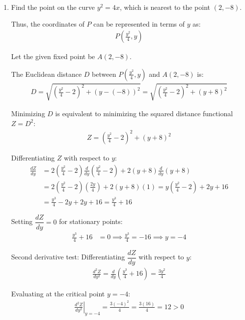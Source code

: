 \begin{enumerate}[label=\thesubsection.\arabic*, ref=\thesubsection.\theenumi]
Cartesian equation: $2x + 3y + 4z = 7$
Vector equation: $\vec{r} \cdot (2\vec{i} + 3\vec{j} + 4\vec{k}) = 7$

\item Find the point on the curve $y^2=4x$, which is nearest to the point $(2,-8)$.

\solution

Thus, the coordinates of $P$ can be represented in terms of $y$ as:
\begin{align*}
	P\left(\frac{y^2}{4}, y\right)
\end{align*}

Let the given fixed point be $A(2, -8)$.

The Euclidean distance $D$ between $P\left(\frac{y^2}{4}, y\right)$ and $A(2, -8)$ is:
\begin{align*}
	D = \sqrt{\left(\frac{y^2}{4} - 2\right)^2 + (y - (-8))^2} = \sqrt{\left(\frac{y^2}{4} - 2\right)^2 + (y + 8)^2}
\end{align*}

Minimizing $D$ is equivalent to minimizing the squared distance functional $Z = D^2$:
\begin{align*}
	Z = \left(\frac{y^2}{4} - 2\right)^2 + (y + 8)^2
\end{align*}

Differentiating $Z$ with respect to $y$:
\begin{align*}
	\frac{dZ}{dy} &= 2\left(\frac{y^2}{4} - 2\right)\frac{d}{dy}\left(\frac{y^2}{4} - 2\right) + 2(y + 8)\frac{d}{dy}(y + 8) \\
	&= 2\left(\frac{y^2}{4} - 2\right)\left(\frac{2y}{4}\right) + 2(y + 8)(1) = y\left(\frac{y^2}{4} - 2\right) + 2y + 16 \\
	&= \frac{y^3}{4} - 2y + 2y + 16 = \frac{y^3}{4} + 16
\end{align*}

Setting $\dfrac{dZ}{dy} = 0$ for stationary points:
\begin{align*}
	\frac{y^3}{4} + 16 &= 0 \implies
	\frac{y^3}{4} = -16 \implies
	y = -4
\end{align*}

Second derivative test:
Differentiating $\dfrac{dZ}{dy}$ with respect to $y$:
\begin{align*}
	\frac{d^2Z}{dy^2} = \frac{d}{dy}\left(\frac{y^3}{4} + 16\right) = \frac{3y^2}{4}
\end{align*}

Evaluating at the critical point $y = -4$:
\begin{align*}
	\left.\frac{d^2Z}{dy^2}\right|_{y=-4} = \frac{3(-4)^2}{4} = \frac{3(16)}{4} = 12 > 0
\end{align*}


\end{enumerate}
